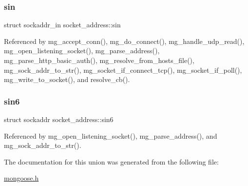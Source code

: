 \mbox{\label{unionsocket__address_af540a7224ea459c48bc6ec1ca592e55d_af540a7224ea459c48bc6ec1ca592e55d}} 
\subsubsection{\texorpdfstring{sin}{sin}}
{\footnotesize\ttfamily struct sockaddr\+\_\+in socket\+\_\+address\+::sin}



Referenced by mg\+\_\+accept\+\_\+conn(), mg\+\_\+do\+\_\+connect(), mg\+\_\+handle\+\_\+udp\+\_\+read(), mg\+\_\+open\+\_\+listening\+\_\+socket(), mg\+\_\+parse\+\_\+address(), mg\+\_\+parse\+\_\+http\+\_\+basic\+\_\+auth(), mg\+\_\+resolve\+\_\+from\+\_\+hosts\+\_\+file(), mg\+\_\+sock\+\_\+addr\+\_\+to\+\_\+str(), mg\+\_\+socket\+\_\+if\+\_\+connect\+\_\+tcp(), mg\+\_\+socket\+\_\+if\+\_\+poll(), mg\+\_\+write\+\_\+to\+\_\+socket(), and resolve\+\_\+cb().

\mbox{\label{unionsocket__address_a923a2caba3cad046553b3632f7c2c571_a923a2caba3cad046553b3632f7c2c571}} 
\subsubsection{\texorpdfstring{sin6}{sin6}}
{\footnotesize\ttfamily struct sockaddr socket\+\_\+address\+::sin6}



Referenced by mg\+\_\+open\+\_\+listening\+\_\+socket(), mg\+\_\+parse\+\_\+address(), and mg\+\_\+sock\+\_\+addr\+\_\+to\+\_\+str().



The documentation for this union was generated from the following file\+:\begin{DoxyCompactItemize}
\item 
\hyperlink{mongoose_8h}{mongoose.\+h}\end{DoxyCompactItemize}

